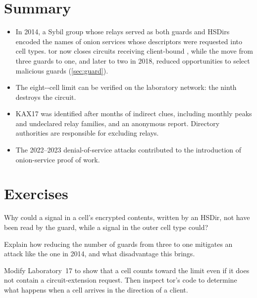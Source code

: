 \section*{Summary}
\begin{itemize}
  \item In 2014, a Sybil group whose relays served as both guards and HSDirs encoded the names of onion services whose descriptors were requested into cell types. tor now closes circuits receiving client-bound , while the move from three guards to one, and later to two in 2018, reduced opportunities to select malicious guards (\cref{sec:guard}).
  \item The eight--cell limit can be verified on the laboratory network: the ninth destroys the circuit.
  \item KAX17 was identified after months of indirect clues, including monthly peaks and undeclared relay families, and an anonymous report. Directory authorities are responsible for excluding relays.
  \item The 2022--2023 denial-of-service attacks contributed to the introduction of onion-service proof of work.
\end{itemize}

\section*{Exercises}

\begin{esercizio}[1]\label{es:27-campo}
Why could a signal in a cell's encrypted contents, written by an HSDir, not have been read by the guard, while a signal in the outer cell type could?
\end{esercizio}

\begin{esercizio}[1]\label{es:27-uno}
Explain how reducing the number of guards from three to one mitigates an attack like the one in 2014, and what disadvantage this brings.
\end{esercizio}

\begin{esercizio}[2]\label{es:27-verso}
Modify Laboratory~17 to show that a  cell counts toward the limit even if it does not contain a circuit-extension request. Then inspect tor's code to determine what happens when a  cell arrives in the direction of a client.
\end{esercizio}

